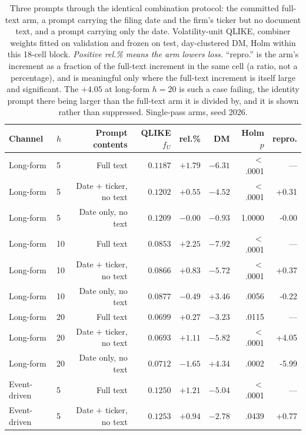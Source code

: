\begin{table}[htbp]
\centering
\caption[Zero-content prompt arms against the recalibrated reference]{Three
prompts through the identical combination protocol: the committed full-text
arm, a prompt carrying the filing date and the firm's ticker but no
document text, and a prompt carrying only the date. Volatility-unit QLIKE,
combiner weights fitted on validation and frozen on test, day-clustered DM,
Holm within this 18-cell block. \emph{Positive rel.\% means the arm lowers
loss.} ``repro.'' is the arm's increment as a fraction of the full-text
increment in the same cell (a ratio, not a percentage), and is
meaningful only where the full-text increment is itself large and
significant. The $+4.05$ at long-form $h{=}20$ is such a case failing, the
identity prompt there being larger than the full-text arm it is divided by,
and it is shown rather than suppressed. Single-pass arms, seed 2026.}
\label{tab:app-contam-arms}
\singlespacing\small
\setlength{\tabcolsep}{4pt}
\begin{tabular}{@{}llrrrrrr@{}}
\toprule
Channel & $h$ & Prompt contents & QLIKE $f_U$ & rel.\% & DM & Holm $p$ & repro. \\
\midrule
Long-form & 5 & Full text & $0.1187$ & $+1.79$ & $-6.31$ & $<$.0001 & --- \\
Long-form & 5 & Date $+$ ticker, no text & $0.1202$ & $+0.55$ & $-4.52$ & $<$.0001 & +0.31 \\
Long-form & 5 & Date only, no text & $0.1209$ & $-0.00$ & $-0.93$ & 1.0000 & -0.00 \\
\addlinespace
Long-form & 10 & Full text & $0.0853$ & $+2.25$ & $-7.92$ & $<$.0001 & --- \\
Long-form & 10 & Date $+$ ticker, no text & $0.0866$ & $+0.83$ & $-5.72$ & $<$.0001 & +0.37 \\
Long-form & 10 & Date only, no text & $0.0877$ & $-0.49$ & $+3.46$ & .0056 & -0.22 \\
\addlinespace
Long-form & 20 & Full text & $0.0699$ & $+0.27$ & $-3.23$ & .0115 & --- \\
Long-form & 20 & Date $+$ ticker, no text & $0.0693$ & $+1.11$ & $-5.82$ & $<$.0001 & +4.05 \\
Long-form & 20 & Date only, no text & $0.0712$ & $-1.65$ & $+4.34$ & .0002 & -5.99 \\
\addlinespace
Event-driven & 5 & Full text & $0.1250$ & $+1.21$ & $-5.04$ & $<$.0001 & --- \\
Event-driven & 5 & Date $+$ ticker, no text & $0.1253$ & $+0.94$ & $-2.78$ & .0439 & +0.77 \\

\end{tabular}
\end{table}
